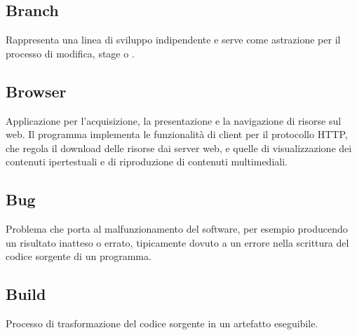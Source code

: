 \subsection*{Branch}
Rappresenta una linea di sviluppo indipendente e serve come astrazione per il processo di modifica, stage o .

\subsection*{Browser}
Applicazione per l'acquisizione, la presentazione e la navigazione di risorse sul web.
Il programma implementa le funzionalità di client per il protocollo HTTP, che regola il download delle risorse dai server web, e quelle di visualizzazione dei contenuti ipertestuali e di riproduzione di contenuti multimediali.

\subsection*{Bug}
Problema che porta al malfunzionamento del software, per esempio producendo un risultato inatteso o errato, tipicamente dovuto a un errore nella scrittura del codice sorgente di un programma. 

\subsection*{Build}
Processo di trasformazione del codice sorgente in un artefatto eseguibile.




